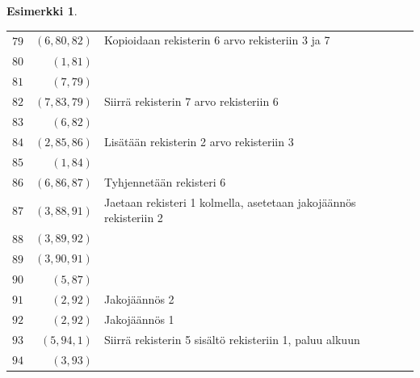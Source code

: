 \documentclass[a4paper, 12pt]{article}
\theoremstyle{definition}
\newtheorem{example}[mydef]{Esimerkki}
\theoremstyle{plain}
\begin{document}
\begin{example}
\begin{tabular}[t]{r|r|l}
$\hat{79}$ & $(6, 80, 82)$  & Kopioidaan rekisterin 6 arvo rekisteriin 3 ja 7\\
$\hat{80}$ & $(1, 81)$  &\\
$\hat{81}$ & $(7, 79)$  &\\
$\hat{82}$ & $(7, 83, 79)$ & Siirrä rekisterin 7 arvo rekisteriin 6 \\
$\hat{83}$ & $(6, 82)$  &\\
$\hat{84}$ & $(2, 85, 86)$  & Lisätään rekisterin 2 arvo rekisteriin 3\\
$\hat{85}$ & $(1, 84)$  &\\
$\hat{86}$ & $(6, 86, 87)$  & Tyhjennetään rekisteri 6\\
$\hat{87}$ & $(3, 88, 91)$  & Jaetaan rekisteri 1 kolmella, asetetaan jakojäännös rekisteriin 2\\
$\hat{88}$ & $(3, 89, 92)$  & \\
$\hat{89}$ & $(3, 90, 91)$  & \\
$\hat{90}$ & $(5, 87)$  & \\
$\hat{91}$ & $(2, 92)$  & Jakojäännös 2 \\
$\hat{92}$ & $(2, 92)$  & Jakojäännös 1 \\
$\hat{93}$ & $(5, 94, 1)$  & Siirrä rekisterin 5 sisältö rekisteriin 1, paluu alkuun \\
$\hat{94}$ & $(3, 93)$  & \\
\end{tabular}


\end{example}
\end{document}

